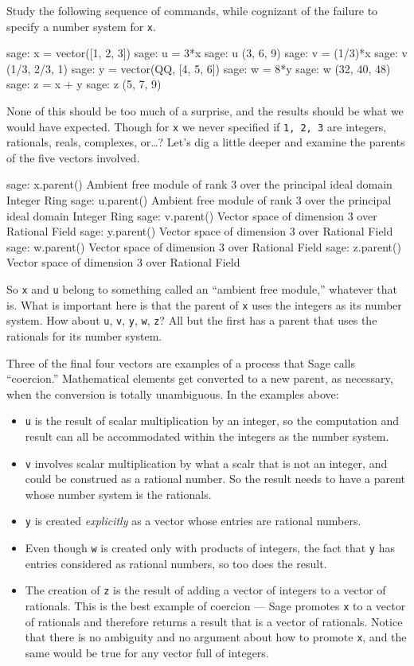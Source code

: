 Study the following sequence of commands, while cognizant of the failure to specify a number system for \verb?x?.
%
\begin{sageexample}
sage: x = vector([1, 2, 3])
sage: u = 3*x
sage: u
(3, 6, 9)
sage: v = (1/3)*x
sage: v
(1/3, 2/3, 1)
sage: y = vector(QQ, [4, 5, 6])
sage: w = 8*y
sage: w
(32, 40, 48)
sage: z = x + y
sage: z
(5, 7, 9)
\end{sageexample}
%
None of this should be too much of a surprise, and the results should be what we would have expected.  Though for \verb?x? we never specified if \texttt{1, 2, 3} are integers, rationals, reals, complexes, or\dots?  Let's dig a little deeper and examine the parents of the five vectors involved.
%
\begin{sageexample}
sage: x.parent()
Ambient free module of rank 3 over
the principal ideal domain Integer Ring
sage: u.parent()
Ambient free module of rank 3 over
the principal ideal domain Integer Ring
sage: v.parent()
Vector space of dimension 3 over Rational Field
sage: y.parent()
Vector space of dimension 3 over Rational Field
sage: w.parent()
Vector space of dimension 3 over Rational Field
sage: z.parent()
Vector space of dimension 3 over Rational Field

\end{sageexample}
%
So \verb?x? and \verb?u? belong to something called an ``ambient free module,'' whatever that is.  What is important here is that the parent of \verb?x? uses the integers as its number system.  How about \verb?u?, \verb?v?, \verb?y?, \verb?w?, \verb?z??  All but the first has a parent that uses the rationals for its number system.\par
%
Three of the final four vectors are examples of a process that Sage calls ``coercion.''  Mathematical elements get converted to a new parent, as necessary, when the conversion is totally unambiguous.  In the examples above:
%
\begin{itemize}
%
\item \texttt{u} is the result of scalar multiplication by an integer, so the computation and result can all be accommodated within the integers as the number system.
%
\item \texttt{v} involves scalar multiplication by what a scalr that is not an integer, and could be construed as a rational number.  So the result needs to have a parent whose number system is the rationals.
%
\item \texttt{y} is created \emph{explicitly} as a vector whose entries are rational numbers.
%
\item Even though \texttt{w} is created only with products of integers, the fact that \texttt{y} has entries considered as rational numbers, so too does the result.
%
\item The creation of \texttt{z} is the result of adding a vector of integers to a vector of rationals.  This is the best example of coercion --- Sage promotes \texttt{x} to a vector of rationals and therefore returns a result that is a vector of rationals.  Notice that there is no ambiguity and no argument about how to promote \texttt{x}, and the same would be true for any vector full of integers.
%
\end{itemize}
